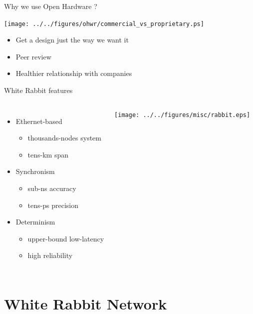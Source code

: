\documentclass[compress,red]{beamer}
\begin{document}
\begin{frame}{Why we use Open Hardware ?}
  \begin{center}
    \texttt{[image: ../../figures/ohwr/commercial\_vs\_proprietary.ps]}
  \end{center}
  \begin{itemize}
    \item Get a design just the way we want it
    \item Peer review
    \item Healthier relationship with companies
  \end{itemize}
\end{frame}
\begin{frame}{White Rabbit features}

\begin{columns}[c]
	  \begin{itemize}
		  \item Ethernet-based
        \begin{itemize}
		      \item thousands-nodes system
		      \item tens-km span
        \end{itemize}
      \item Synchronism
        \begin{itemize}
		      \item sub-ns accuracy
		      \item tens-ps precision
        \end{itemize}
      \item Determinism
        \begin{itemize}
		      \item upper-bound low-latency
		      \item high reliability
        \end{itemize}
	  \end{itemize}
		\begin{center}
		\texttt{[image: ../../figures/misc/rabbit.eps]}
		\end{center}
	\end{columns}

\end{frame}

\section[WR Network]{White Rabbit Network}
\end{document}
